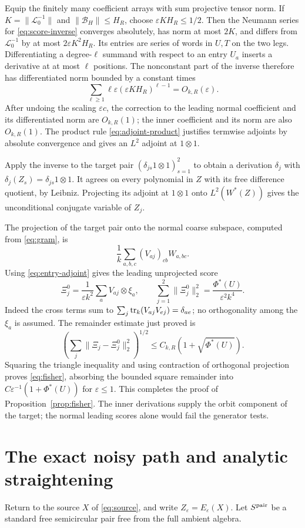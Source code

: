 \documentclass[11pt]{article}
\theoremstyle{definition}\newtheorem{definition}[theorem]{Definition}
\theoremstyle{remark}\newtheorem{remark}[theorem]{Remark}
\newcommand{\eps}{\varepsilon}\newcommand{\id}{\mathrm{id}}
\begin{document}
Equip the finitely many coefficient arrays with sum projective tensor
norm. If $K=\|\mathcal L_0^{-1}\|$ and
$\|\mathcal B_H\|\leq H_R$, choose $\eps KH_R\leq1/2$.
Then the Neumann series for \eqref{eq:score-inverse} converges absolutely,
has norm at most $2K$, and differs from $\mathcal L_0^{-1}$ by at most
$2\eps K^2H_R$. Its entries are series of words in $U,T$ on the two
legs. Differentiating a degree-$\ell$ summand with respect to an entry
$U_a$ inserts a derivative at at most $\ell$ positions. The
nonconstant part of the inverse therefore has differentiated norm
bounded by a constant times
\[
 \sum_{\ell\geq1}\ell\eps(\eps KH_R)^{\ell-1}=O_{k,R}(\eps).
\]
After undoing the scaling $\eps c$, the correction to the leading
normal coefficient and its differentiated norm are $O_{k,R}(1)$;
the inner coefficient and its norm are also $O_{k,R}(1)$.
The product rule \eqref{eq:adjoint-product} justifies termwise
adjoints by absolute convergence and gives an $L^2$ adjoint at
$1\otimes1$.

Apply the inverse to the target pair
$(\delta_{js}1\otimes1)_{s=1}^2$ to obtain a derivation $\delta_j$
with $\delta_j(Z_s)=\delta_{js}1\otimes1$. It agrees on every
polynomial in $Z$ with its free difference quotient, by Leibniz.
Projecting its adjoint at $1\otimes1$ onto $L^2(W^*(Z))$ gives the
unconditional conjugate variable of $Z_j$.

The projection of the target pair onto the normal coarse subspace,
computed from \eqref{eq:gram}, is
\[
 \frac1k\sum_{a,b,c}(V_{aj})_{cb}W_{a,bc}.
\]
Using \eqref{eq:entry-adjoint} gives the leading unprojected score
\begin{equation}\label{eq:leading-score}
 \Xi_j^0=\frac1{\eps k^2}\sum_a V_{aj}\otimes\xi_a,
 \qquad
 \sum_{j=1}^2\|\Xi_j^0\|_2^2
 =\frac{\Phi^*(U)}{\eps^2k^4}.
\end{equation}
Indeed the cross terms sum to
$\sum_j\operatorname{tr}_k(V_{aj}V_{ej})=\delta_{ae}$; no orthogonality among the
$\xi_a$ is assumed. The remainder estimate just proved is
\[
 \left(\sum_j\|\Xi_j-\Xi_j^0\|_2^2\right)^{1/2}
 \leq C_{k,R}(1+\sqrt{\Phi^*(U)}).
\]
Squaring the triangle inequality and using contraction of orthogonal
projection proves \eqref{eq:fisher}, absorbing the bounded square
remainder into $C\eps^{-1}(1+\Phi^*(U))$ for $\eps\leq1$.
This completes the proof of Proposition~\ref{prop:fisher}.
The inner derivations supply the orbit component of the target;
the normal leading scores alone would fail the generator tests.

\section{The exact noisy path and analytic straightening}
\label{sec:coupling}
Return to the source $X$ of \eqref{eq:source}, and write
$Z_\eps=E_\eps(X)$. Let $S^{\rm pair}$ be a standard free
semicircular pair free from the full ambient algebra.
\end{document}
